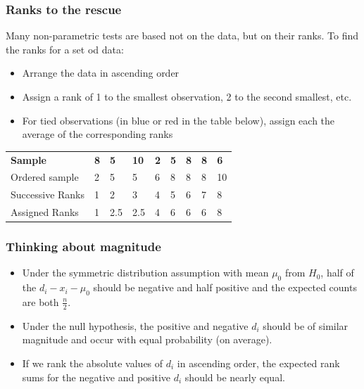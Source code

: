 \documentclass[a4paper]{article}
\begin{document}
\subsubsection{Ranks to the rescue}
Many non-parametric tests are based not on the data, but on their \textcolor{mygreen}{ranks}.
To find the ranks for a set od data:
\begin{itemize}
	\item Arrange the data in ascending order
	\item Assign a rank of 1 to the smallest observation, 2 to the second smallest, etc.
	\item For tied observations (in \textcolor{mygreen}{blue} or \textcolor{myred}{red} in the table below), assign each the average of the corresponding ranks
\end{itemize}
\begin{table}[H]
	\centering
	\begin{tabular}{@{}lllllllll@{}}
	\textbf{Sample}  & \textcolor{myred}{\textbf{8}} & \textcolor{mygreen}{\textbf{5}} & \textbf{10} & \textbf{2} & \textcolor{mygreen}{\textbf{5}} & \textcolor{myred}{\textbf{8}} & \textcolor{myred}{\textbf{8}} & \textbf{6}  \\
	Ordered sample   & 2 & \textcolor{mygreen}{5} & \textcolor{mygreen}{5} & 6 & \textcolor{myred}{8} & \textcolor{myred}{8} & \textcolor{myred}{8} & 10 \\
	Successive Ranks & 1 & \textcolor{mygreen}{2} & \textcolor{mygreen}{3} & 4 & \textcolor{myred}{5} & \textcolor{myred}{6} & \textcolor{myred}{7} & 8  \\
	Assigned Ranks   & 1 & \textcolor{mygreen}{2.5} & \textcolor{mygreen}{2.5} & 4 & \textcolor{myred}{6} & \textcolor{myred}{6} & \textcolor{myred}{6} & 8 
	\end{tabular}
\end{table}
\subsubsection{Thinking about magnitude}
\begin{itemize}
	\item Under the symmetric distribution assumption with mean \( \mu_0 \) from \( H_0 \), half of the \( d_i - x_i - \mu_0 \) should be negative and half positive and the expected counts are both \( \frac{n}{2} \).
	\item Under the null hypothesis, the positive and negative \( d_i \) should be of similar magnitude and occur with equal probability (on average).
	\item If we rank the absolute values of \( d_i \) in ascending order, the expected rank sums for the negative and positive \( d_i \) should be nearly equal.
\end{itemize}
\end{document}
